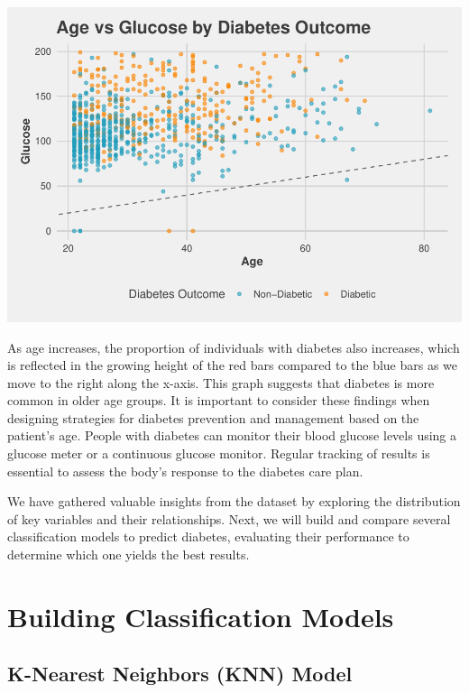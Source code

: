 \documentclass[
]{article}
\begin{document}
\begin{center}\includegraphics{Diabetes-Project_files/figure-latex/age vs glucose-1} \end{center}

As age increases, the proportion of individuals with diabetes also
increases, which is reflected in the growing height of the red bars
compared to the blue bars as we move to the right along the x-axis. This
graph suggests that diabetes is more common in older age groups. It is
important to consider these findings when designing strategies for
diabetes prevention and management based on the patient's age. People
with diabetes can monitor their blood glucose levels using a glucose
meter or a continuous glucose monitor. Regular tracking of results is
essential to assess the body's response to the diabetes care plan.

We have gathered valuable insights from the dataset by exploring the
distribution of key variables and their relationships. Next, we will
build and compare several classification models to predict diabetes,
evaluating their performance to determine which one yields the best
results.

\newpage

\section{Building Classification
Models}\label{building-classification-models}

\subsection{K-Nearest Neighbors (KNN)
Model}\label{k-nearest-neighbors-knn-model}
\end{document}

